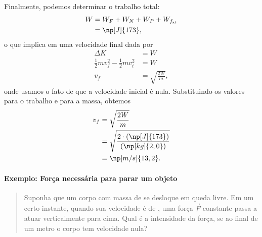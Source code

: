 Finalmente, podemos determinar o trabalho total:
\begin{align}
    W &= W_F + W_N + W_P + W_{f_{\rm{at}}} \\
    &= \np[J]{173},
\end{align}
%
o que implica em uma velocidade final dada por
\begin{align}
    \Delta K &= W \\
    \frac{1}{2} mv_f^2 - \frac{1}{2} m v_i^2 &= W \\
    v_f &= \sqrt{\frac{2W}{m}},
\end{align}
%
onde usamos o fato de que a velocidade inicial é nula. Substituindo os valores para o trabalho e para a massa, obtemos
\begin{align}
    v_f &= \sqrt{\frac{2W}{m}} \\
    &= \sqrt{\frac{2\cdot(\np[J]{173})}{(\np[kg]{2,0})}} \\
    &= \np[m/s]{13,2}.
\end{align}

\paragraph{Exemplo: Força necessária para parar um objeto}

\begin{quote}
    Suponha que um corpo com massa de  se desloque em queda livre. Em um certo instante, quando sua velocidade é de , uma força $\vec{F}$ constante passa a atuar verticalmente para cima. Qual é a intensidade da força, se ao final de um metro o corpo tem velocidade nula?
\end{quote}

